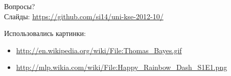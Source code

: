 \documentclass[10pt]{beamer}
\begin{document}
\begin{frame}
  \begin{center}
    \Large
    Вопросы?\\
    \vspace{10pt}
    \small
    Слайды: \url{https://github.com/si14/uni-kse-2012-10/}
  \end{center}
\end{frame}

\begin{frame}\label{lastframe}
  \footnotesize
  Использовались картинки:
  \begin{itemize}
    \item \url{http://en.wikipedia.org/wiki/File:Thomas_Bayes.gif}
    \item \url{http://mlp.wikia.com/wiki/File:Happy_Rainbow_Dash_S1E1.png}
  \end{itemize}
\end{frame}
\end{document}
